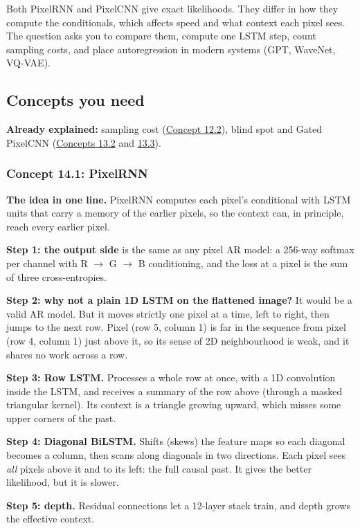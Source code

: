 \documentclass[12pt,a4paper]{article}
\begin{document}
Both PixelRNN and PixelCNN give exact likelihoods. They differ in how they compute the conditionals, which affects speed and what context each pixel sees. The question asks you to compare them, compute one LSTM step, count sampling costs, and place autoregression in modern systems (GPT, WaveNet, VQ-VAE).

\subsection{Concepts you need}

\textbf{Already explained:} sampling cost (\hyperref[c12-2]{Concept 12.2}), blind spot and Gated PixelCNN (\hyperref[c13-2]{Concepts 13.2} and \hyperref[c13-3]{13.3}).

\subsubsection{Concept 14.1: PixelRNN}\label{c14-1}

\textbf{The idea in one line.} PixelRNN computes each pixel's conditional with LSTM units that carry a memory of the earlier pixels, so the context can, in principle, reach every earlier pixel.

\textbf{Step 1: the output side} is the same as any pixel AR model: a 256-way softmax per channel with R $\to$ G $\to$ B conditioning, and the loss at a pixel is the sum of three cross-entropies.

\textbf{Step 2: why not a plain 1D LSTM on the flattened image?} It would be a valid AR model. But it moves strictly one pixel at a time, left to right, then jumps to the next row. Pixel (row 5, column 1) is far in the sequence from pixel (row 4, column 1) just above it, so its sense of 2D neighbourhood is weak, and it shares no work across a row.

\textbf{Step 3: Row LSTM.} Processes a whole row at once, with a 1D convolution inside the LSTM, and receives a summary of the row above (through a masked triangular kernel). Its context is a triangle growing upward, which misses some upper corners of the past.

\textbf{Step 4: Diagonal BiLSTM.} Shifts (skews) the feature maps so each diagonal becomes a column, then scans along diagonals in two directions. Each pixel sees \emph{all} pixels above it and to its left: the full causal past. It gives the better likelihood, but it is slower.

\textbf{Step 5: depth.} Residual connections let a 12-layer stack train, and depth grows the effective context.
\end{document}
